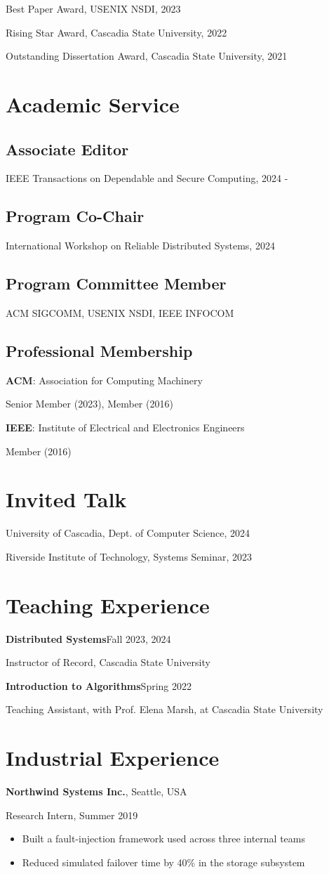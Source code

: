 \documentclass{article}
\newcommand{\cvsection}[1]{\section*{\rmfamily#1}}
\newcommand{\cvsubsection}[1]{\subsection*{\rmfamily\hspace{1.6em}#1}}
\begin{document}
Best Paper Award, USENIX NSDI, 2023

Rising Star Award, Cascadia State University, 2022

Outstanding Dissertation Award, Cascadia State University, 2021


\cvsection{Academic Service}

\cvsubsection{Associate Editor}

IEEE Transactions on Dependable and Secure Computing, 2024 -

\cvsubsection{Program Co-Chair}

International Workshop on Reliable Distributed Systems, 2024

\cvsubsection{Program Committee Member}

ACM SIGCOMM, USENIX NSDI, IEEE INFOCOM

\cvsubsection{Professional Membership}

\textbf{ACM}: Association for Computing Machinery

\hspace{2em}Senior Member (2023), Member (2016)

\textbf{IEEE}: Institute of Electrical and Electronics Engineers

\hspace{2em}Member (2016)





\cvsection{Invited Talk}

University of Cascadia, Dept. of Computer Science, 2024

Riverside Institute of Technology, Systems Seminar, 2023


\cvsection{Teaching Experience}

\textbf{Distributed Systems}\hfill Fall 2023, 2024

\hspace{2em}Instructor of Record, Cascadia State University

\textbf{Introduction to Algorithms}\hfill Spring 2022

\hspace{2em}Teaching Assistant, with Prof. Elena Marsh, at Cascadia State University


\cvsection{Industrial Experience}

\textbf{Northwind Systems Inc.}, Seattle, USA

\hspace{2em}Research Intern, Summer 2019
\begin{itemize}[leftmargin=5em, topsep=0pt, itemsep=0pt]
    \item Built a fault-injection framework used across three internal teams
    \item Reduced simulated failover time by 40\% in the storage subsystem
\end{itemize}
\end{document}
